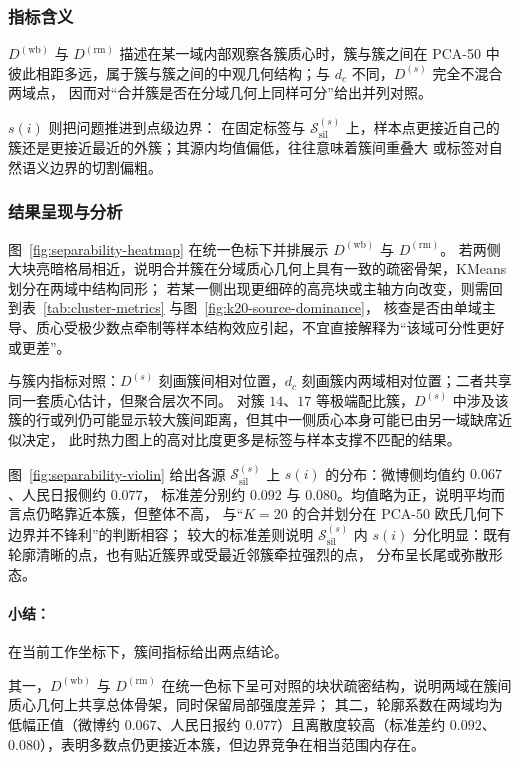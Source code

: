 \documentclass[withoutpreface]{cumcmthesis}
\begin{document}
\subsubsection{指标含义}
$D^{(\mathrm{wb})}$ 与 $D^{(\mathrm{rm})}$ 描述在某一域内部观察各簇质心时，簇与簇之间在 PCA-50 中
彼此相距多远，属于簇与簇之间的中观几何结构；与 $d_c$ 不同，$D^{(s)}$ 完全不混合两域点，
因而对“合并簇是否在分域几何上同样可分”给出并列对照。

$s(i)$ 则把问题推进到点级边界：
在固定标签与 $\mathcal{S}_{\mathrm{sil}}^{(s)}$ 上，样本点更接近自己的簇还是更接近最近的外簇；其源内均值偏低，往往意味着簇间重叠大
或标签对自然语义边界的切割偏粗。

\subsubsection{结果呈现与分析}
图~\ref{fig:separability-heatmap} 在统一色标下并排展示 $D^{(\mathrm{wb})}$ 与 $D^{(\mathrm{rm})}$。
若两侧大块亮暗格局相近，说明合并簇在分域质心几何上具有一致的疏密骨架，KMeans 划分在两域中结构同形；
若某一侧出现更细碎的高亮块或主轴方向改变，则需回到表~\ref{tab:cluster-metrics} 与图~\ref{fig:k20-source-dominance}，
核查是否由单域主导、质心受极少数点牵制等样本结构效应引起，不宜直接解释为“该域可分性更好或更差”。

与簇内指标对照：$D^{(s)}$ 刻画簇间相对位置，$d_c$ 刻画簇内两域相对位置；二者共享同一套质心估计，但聚合层次不同。
对簇 $14$、$17$ 等极端配比簇，$D^{(s)}$ 中涉及该簇的行或列仍可能显示较大簇间距离，但其中一侧质心本身可能已由另一域缺席近似决定，
此时热力图上的高对比度更多是标签与样本支撑不匹配的结果。

图~\ref{fig:separability-violin} 给出各源 $\mathcal{S}_{\mathrm{sil}}^{(s)}$ 上 $s(i)$ 的分布：微博侧均值约 $0.067$、人民日报侧约 $0.077$，
标准差分别约 $0.092$ 与 $0.080$。均值略为正，说明平均而言点仍略靠近本簇，但整体不高，
与“$K=20$ 的合并划分在 PCA-50 欧氏几何下边界并不锋利”的判断相容；
较大的标准差则说明 $\mathcal{S}_{\mathrm{sil}}^{(s)}$ 内 $s(i)$ 分化明显：既有轮廓清晰的点，也有贴近簇界或受最近邻簇牵拉强烈的点，
分布呈长尾或弥散形态。

\paragraph{小结：} 在当前工作坐标下，簇间指标给出两点结论。

其一，$D^{(\mathrm{wb})}$ 与 $D^{(\mathrm{rm})}$ 在统一色标下呈可对照的块状疏密结构，说明两域在簇间质心几何上共享总体骨架，同时保留局部强度差异；
其二，轮廓系数在两域均为低幅正值（微博约 $0.067$、人民日报约 $0.077$）且离散度较高（标准差约 $0.092$、$0.080$），表明多数点仍更接近本簇，但边界竞争在相当范围内存在。
\end{document}
